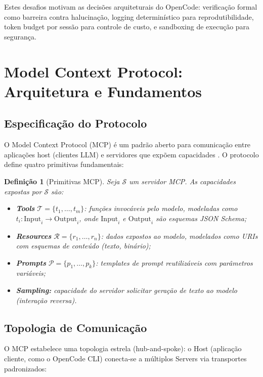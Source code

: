 \documentclass[12pt,a4paper,sumario=tradicional]{abntex2}
\newtheorem{definition}{Definição}[chapter]
\begin{document}
Estes desafios motivam as decisões arquiteturais do OpenCode: verificação formal como barreira contra halucinação, logging determinístico para reprodutibilidade, token budget por sessão para controle de custo, e sandboxing de execução para segurança.

\section{Model Context Protocol: Arquitetura e Fundamentos}

\subsection{Especificação do Protocolo}

O Model Context Protocol (MCP) é um padrão aberto para comunicação entre aplicações host (clientes LLM) e servidores que expõem capacidades \cite{ayyagari2025mcp, sekarmcp2026}. O protocolo define quatro primitivas fundamentais:

\begin{definition}[Primitivas MCP]
Seja $\mathcal{S}$ um servidor MCP. As capacidades expostas por $\mathcal{S}$ são:
\begin{itemize}
    \item \textbf{Tools} $\mathcal{T} = \{t_1, \ldots, t_m\}$: funções invocáveis pelo modelo, modeladas como $t_i: \text{Input}_i \rightarrow \text{Output}_i$, onde $\text{Input}_i$ e $\text{Output}_i$ são esquemas JSON Schema;
    \item \textbf{Resources} $\mathcal{R} = \{r_1, \ldots, r_n\}$: dados expostos ao modelo, modelados como URIs com esquemas de conteúdo (texto, binário);
    \item \textbf{Prompts} $\mathcal{P} = \{p_1, \ldots, p_k\}$: templates de prompt reutilizáveis com parâmetros variáveis;
    \item \textbf{Sampling:} capacidade do servidor solicitar geração de texto ao modelo (interação reversa).
\end{itemize}
\end{definition}

\subsection{Topologia de Comunicação}

O MCP estabelece uma topologia estrela (hub-and-spoke): o Host (aplicação cliente, como o OpenCode CLI) conecta-se a múltiplos Servers via transportes padronizados:
\end{document}
